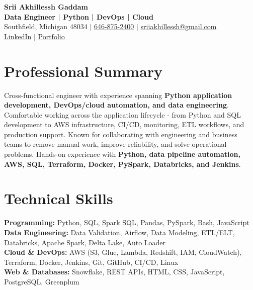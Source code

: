 \documentclass[letterpaper,10pt]{article}
\begin{document}
\fontsize{9.35pt}{10.45pt}\selectfont

\begin{center}
    {\LARGE \textbf{Srii Akhillessh Gaddam}} \\[-1pt]
    \textbf{Data Engineer | Python | DevOps | Cloud} \\[2pt]
    Southfield, Michigan 48034 $|$
    \href{tel:6468752400}{646-875-2400} $|$
    \href{mailto:sriiakhillessh@gmail.com}{sriiakhillessh@gmail.com} \\[1pt]
    \href{https://www.linkedin.com/in/srii-akhiilessh-gaddam-b48668191/}{LinkedIn} $|$
    \href{https://sriiakhillesshg.github.io/portfolio/}{Portfolio}
\end{center}
\vspace{-8pt}

\section{Professional Summary}
\small{Cross-functional engineer with experience spanning \textbf{Python application development, DevOps/cloud automation, and data engineering}. Comfortable working across the application lifecycle - from Python and SQL development to AWS infrastructure, CI/CD, monitoring, ETL workflows, and production support. Known for collaborating with engineering and business teams to remove manual work, improve reliability, and solve operational problems. Hands-on experience with \textbf{Python, data pipeline automation, AWS, SQL, Terraform, Docker, PySpark, Databricks, and Jenkins}.}

\section{Technical Skills}
\small{
\textbf{Programming:} Python, SQL, Spark SQL, Pandas, PySpark, Bash, JavaScript \\
\textbf{Data Engineering:} Data Validation, Airflow, Data Modeling, ETL/ELT, Databricks, Apache Spark, Delta Lake, Auto Loader \\
\textbf{Cloud \& DevOps:} AWS (S3, Glue, Lambda, Redshift, IAM, CloudWatch), Terraform, Docker, Jenkins, Git, GitHub, CI/CD, Linux \\
\textbf{Web \& Databases:} Snowflake, REST APIs, HTML, CSS, JavaScript, PostgreSQL, Greenplum
}

\end{document}
